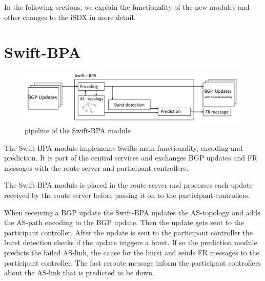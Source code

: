 In the following sections, we explain the functionality of the new modules and other changes to the iSDX in more detail.

\section{\label{chapter4:Swift-BPA}Swift-BPA}

\begin{figure}[h]
\center
\includegraphics[scale = 0.5]{Figures/design_swift_bpa_cropped.pdf}
\caption{pipeline of the Swift-BPA module}
\end{figure}

The Swift-BPA module implements Swifts main functionality, encoding and prediction. It is part of the central services and exchanges BGP updates and FR messages with the route server and participant controllers.

The Swift-BPA module is placed in the route server and processes each update received by the route server before passing it on to the participant controllers. 

When receiving a BGP update the Swift-BPA updates the AS-topology and adds the AS-path encoding to the BGP update. Then the update gets sent to the participant controller. 
After the update is sent to the participant controller the burst detection checks if the update triggers a burst. If so the prediction module predicts the failed AS-link, the cause for the burst and sends FR messages to the participant controller. 
The fast reroute message inform the participant controllers about the AS-link that is predicted to be down. 

